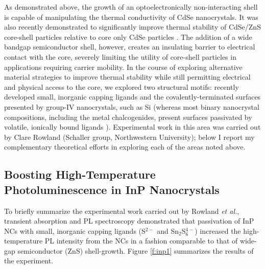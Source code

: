 As demonstrated above, the growth of an optoelectronically non-interacting shell is capable of manipulating the thermal conductivity of CdSe nanocrystals. It was also recently demonstrated to significantly improve thermal stability of CdSe/ZnS core-shell particles relative to core only CdSe particles \cite{rowland2013exciton}. The addition of a wide bandgap semiconductor shell, however, creates an insulating barrier to electrical contact with the core, severely limiting the utility of core-shell particles in applications requiring carrier mobility. In the course of exploring alternative material strategies to improve thermal stability while still permitting electrical and physical access to the core, we explored two structural motifs: recently developed small, inorganic capping ligands and the covalently-terminated surfaces presented by group-IV nanocrystals, such as Si (whereas most binary nanocrystal compositions, including the metal chalcogenides, present surfaces passivated by volatile, ionically bound ligands \cite{porter2008photoconduction}). Experimental work in this area was carried out by Clare Rowland (Schaller group, Northwestern University); below I report my complementary theoretical efforts in exploring each of the areas noted above.

\subsection{Boosting High-Temperature Photoluminescence in InP Nanocrystals}
To briefly summarize the experimental work carried out by Rowland \emph{et al.}, transient absorption and PL spectroscopy demonstrated that passivation of InP NCs with small, inorganic capping ligands (S$^{2-}$ and Sn$_2$S$_6^{4-}$) increased the high-temperature PL intensity from the NCs in a fashion comparable to that of wide-gap semiconductor (ZnS) shell-growth. Figure \ref{f:inp1} summarizes the results of the experiment. \par

